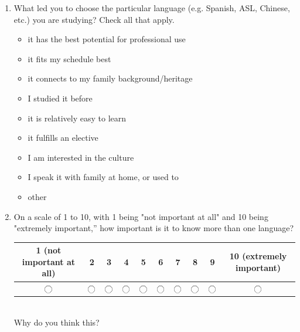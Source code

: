 \documentclass[letterpaper,10pt]{article}
\begin{document}
\begin{enumerate}
\item What led you to choose the particular language (e.g. Spanish, ASL, Chinese, etc.) you are studying? Check all that apply.
\vspace{-0.1in}\begin{multicols}{2}
\begin{itemize}
	\item it has the best potential for professional use
	\item it fits my schedule best
	\item it connects to my family background/heritage
	\item I studied it before
	\item it is relatively easy to learn
	\item it fulfills an elective
	\item I am interested in the culture
	\item I speak it with family at home, or used to
	\item other \underline{\hspace{2in}}
\end{itemize}
\end{multicols}

\item On a scale of 1 to 10, with 1 being "not important at all" and 10 being "extremely important,” how important is it to know more than one language?\\

\renewcommand{\arraystretch}{1.2}
\begin{tabular}{|c|c|c|c|c|c|c|c|c|c|}
\hline
1 (not important at all) & 2&3&4&5&6&7&8&9&10 (extremely important)\\
\hline
$\octagon$&$\octagon$&$\octagon$&$\octagon$&$\octagon$&$\octagon$&$\octagon$&$\octagon$&$\octagon$&$\octagon$\\
\hline
\end{tabular}\\[0.05in]

Why do you think this? \underline{\hspace{3in}}

\end{enumerate}
\newpage
{}
\end{document}
